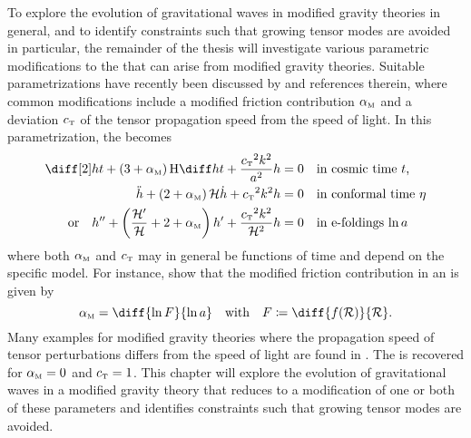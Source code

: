 To explore the evolution of gravitational waves in modified gravity theories in general, and to identify constraints such that growing tensor modes are avoided in particular, the remainder of the thesis will investigate various parametric modifications to the  that can arise from modified gravity theories. Suitable parametrizations have recently been discussed by \textcite{Bellini2014,Saltas2014,Amendola2014,Raveri2014,Pettorino2014,Linder2014,Amendola2015,Xu2015} and references therein, where common modifications include a modified friction contribution \({\alpha_{\textnormal{\tiny{M}}}}\) and a deviation \({c_{\textnormal{\tiny{T}}}}\) of the tensor propagation speed from the speed of light. In this parametrization, the  becomes \autocite{Amendola2014,Raveri2014,Pettorino2014}%
\begin{subequations}\label{eq:evolution_friction}%
\begin{align}%
	\ddt{h} + \del{3 + \alphaM} \Hcosm \dt{h} + \frac{\cT^2 k^2}{a^2} h &= 0 \quad \text{in cosmic time \(t\),} \\
	\ddconf{h} + \del{2 + \alphaM} \Hconf \dconf{h} + \cT^2 k^2 h &= 0 \quad \text{in conformal time \(\conft\)} \\
    \text{or} \quad \ddefold{h} + \del{\frac{\defold{\Hconf}}{\Hconf} + 2 + \alphaM} \defold{h} + \frac{\cT^2 k^2}{\Hconf^2} h &= 0 \quad \text{in e-foldings \(\efold\)}
\end{align}
\end{subequations}
where both \({\alpha_{\textnormal{\tiny{M}}}}\) and \({c_{\textnormal{\tiny{T}}}}\) may in general be functions of time and depend on the specific model. For instance, \textcite{Hwang1996} show that the modified friction contribution in an  is given by
\begin{equation}
	\alphaM = \diff{\ln{F}}{\efold} \quad \text{with} \quad F \defeq \diff{f(\Rscal)}{\Rscal}
	\eqpunct{.}
\end{equation}
Many examples for modified gravity theories where the propagation speed of tensor perturbations differs from the speed of light are found in \textcite{Raveri2014,Amendola2014,Linder2014}. The  is recovered for \({\alpha_{\textnormal{\tiny{M}}}}=0\) and \({c_{\textnormal{\tiny{T}}}}=1\). This chapter will explore the evolution of gravitational waves in a modified gravity theory that reduces to a modification of one or both of these parameters and identifies constraints such that growing tensor modes are avoided.


